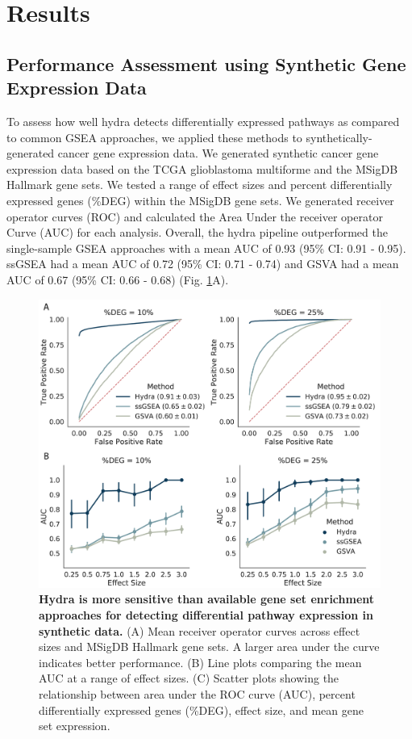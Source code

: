 \documentclass[10pt,letterpaper]{article}
\begin{document}
\section*{Results}
\subsection{Performance Assessment using Synthetic Gene Expression Data}
To assess how well hydra detects differentially expressed pathways as compared to common GSEA approaches, we applied these methods to synthetically-generated cancer gene expression data. We generated synthetic cancer gene expression data based on the TCGA glioblastoma multiforme and the MSigDB Hallmark gene sets. We tested a range of effect sizes and percent differentially expressed genes (\%DEG) within the MSigDB gene sets. We generated receiver operator curves (ROC) and calculated the Area Under the receiver operator Curve (AUC) for each analysis. Overall, the hydra pipeline outperformed the single-sample GSEA approaches with a mean AUC of 0.93 (95\% CI: 0.91 - 0.95). ssGSEA had a mean AUC of 0.72 (95\% CI: 0.71 - 0.74) and GSVA had a mean AUC of 0.67 (95\% CI: 0.66 - 0.68) (Fig. \ref{rocplot}A).

\begin{figure}[!h]
	\includegraphics[width=\textwidth]{img/ROC-PLOT-2x}
	\caption{{\bf Hydra is more sensitive than available gene set enrichment approaches for detecting differential pathway expression in synthetic data.}
		(A) Mean receiver operator curves across effect sizes and MSigDB Hallmark gene sets. A larger area under the curve indicates better performance. (B) Line plots comparing the mean AUC at a range of effect sizes. (C) Scatter plots showing the relationship between area under the ROC curve (AUC), percent differentially expressed genes (\%DEG), effect size, and mean gene set expression.
		\label{rocplot}}
\end{figure}
\end{document}
